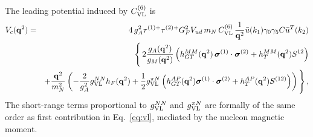 \documentclass[letterpaper,11pt]{article}
\newcommand{\g}{\gamma}
\newcommand{\bea}{\begin{eqnarray}}
\newcommand{\eea}{\end{eqnarray}}
\newcommand{\boldsigma}{\mbox{\boldmath $\sigma$}}
\renewcommand{\vec}[1]{{\mathbf #1}}
\newcommand{\sq}{^{2}}
\newcommand{\nn}{\nonumber}
\begin{document}
The leading potential induced by $C^{(6)}_{\rm VL}$ is 
\bea\label{eq:vl}
V_c(\vec q^2) &=&  
\, 4 \,  g_A\sq \tau^{(1) +} \tau^{(2) + }  G_F^2V_{ud}  \, m_N \,C^{(6)}_{\textrm{VL}}\,   \frac{1}{\vec q\sq} \bar u(k_1)  \gamma_0 \g_5 C \bar u^T(k_2) \nn \\
& & \Bigg\{ 
\,2  \frac{g_A(\vec q\sq)}{g_M(\vec q\sq)}\left(h_{GT}^{MM}(\vec q\sq)\,\boldsigma^{(1)} \cdot \boldsigma^{(2)}  +h_T^{MM}(\vec q\sq)S^{12} \right)
  \\ & & 
+ \frac{\vec q^2}{m_N^2} \left(- \frac{2}{g_A^2}g^{NN}_{\rm VL}  h_{F}(\vec q^2)
+ \frac{1}{2} g^{\pi N}_{\rm VL}\left( h^{AP}_{GT}(\vec q^2){\boldsigma^{(1)} \cdot \boldsigma^{(2)} } + h^{AP}_{T}(\vec q^2){S^{(12)}}\right)\right)
\Bigg\}\,,\nn
\eea
The short-range terms proportional to $g^{NN}_{\rm VL}$ and $g^{\pi N}_{\rm VL}$ are formally of the same order 
as first contribution in Eq.\ \eqref{eq:vl}, mediated by the nucleon magnetic moment. 
\end{document}
